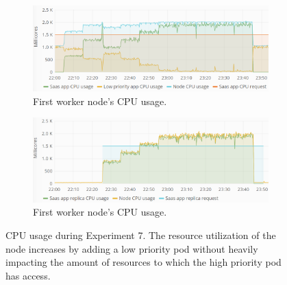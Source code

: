 \begin{figure}
\centering
\begin{subfigure}[b]{0.9\columnwidth}
\centering
\includegraphics[width=0.75\columnwidth]{Images/Experiments/CPU/Grafana/cpu-saas-lpp-hpa-li-1.PNG}
\caption{First worker node's CPU usage.}
\label{fig:cpu-saas-lpp-hpa-li-1}
\end{subfigure}
\hfill
\begin{subfigure}[b]{0.9\columnwidth}
\centering
\includegraphics[width=0.75\columnwidth]{Images/Experiments/CPU/Grafana/cpu-saas-lpp-hpa-li-2.PNG}
\caption{First worker node's CPU usage.}
\label{fig:cpu-saas-lpp-hpa-li-2}
\end{subfigure}
\hfill
\caption{CPU usage during Experiment 7. The resource utilization of the node increases by adding a low priority pod without heavily impacting the amount of resources to which the high priority pod has access.}
\label{fig:cpu-saas-lpp-hpa-li}
\end{figure}
